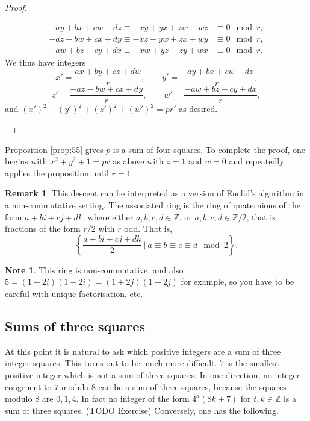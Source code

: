 \documentclass{article}
\newcommand{\Z}{\mathbb{Z}}
\newcommand{\rb}[1]{\left( #1 \right)}
\newcommand{\cb}[1]{\left\{ #1 \right\}}
\theoremstyle{definition}\newtheorem{definition}{Definition}
\theoremstyle{definition}\newtheorem{remark}[definition]{Remark}
\theoremstyle{definition}\newtheorem*{example}{Example}
\theoremstyle{definition}\newtheorem*{note}{Note}
\begin{document}
\begin{proof}
\begin{enumerate}
\begin{align*}
-ay + bx + cw - dz \equiv -xy + yx + zw - wz & \equiv 0 \mod r, \\
-az - bw + cx + dy \equiv -xz - yw + zx + wy & \equiv 0 \mod r, \\
-aw + bz - cy + dx \equiv -xw + yz - zy + wx & \equiv 0 \mod r.
\end{align*}
We thus have integers
$$ x' = \dfrac{ax + by + cz + dw}{r}, \qquad y' = \dfrac{-ay + bx + cw - dz}{r}, $$
$$ z' = \dfrac{-az - bw + cx + dy}{r}, \qquad w' = \dfrac{-aw + bz - cy + dx}{r}, $$
and $ \rb{x'}^2 + \rb{y'}^2 + \rb{z'}^2 + \rb{w'}^2 = pr' $ as desired.
\end{enumerate}
\end{proof}

Proposition \ref{prop:55} gives $ p $ is a sum of four squares. To complete the proof, one begins with $ x^2 + y^2 + 1 = pr $ as above with $ z = 1 $ and $ w = 0 $ and repeatedly applies the proposition until $ r = 1 $.

\begin{remark}
This descent can be interpreted as a version of Euclid's algorithm in a non-commutative setting. The associated ring is the ring of quaternions of the form $ a + bi + cj + dk $, where either $ a, b, c, d \in \Z $, or $ a, b, c, d \in \Z / 2 $, that is fractions of the form $ r / 2 $ with $ r $ odd. That is,
$$ \cb{\dfrac{a + bi + cj + dk}{2} \ \Bigg| \ a \equiv b \equiv c \equiv d \mod 2}. $$
\end{remark}

\begin{note}
This ring is non-commutative, and also $ 5 = \rb{1 - 2i}\rb{1 - 2i} = \rb{1 + 2j}\rb{1 - 2j} $ for example, so you have to be careful with unique factorisation, etc.
\end{note}

\subsection{Sums of three squares}

At this point it is natural to ask which positive integers are a sum of three integer squares. This turns out to be much more difficult. $ 7 $ is the smallest positive integer which is not a sum of three squares. In one direction, no integer congruent to $ 7 $ modulo $ 8 $ can be a sum of three squares, because the squares modulo $ 8 $ are $ 0, 1, 4 $. In fact no integer of the form $ 4^a\rb{8k + 7} $ for $ t, k \in \Z $ is a sum of three squares. (TODO Exercise) Conversely, one has the following.
\end{document}
